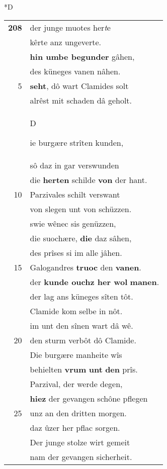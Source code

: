 \documentclass[8pt,a4paper,notitlepage]{article}
\begin{document}
\begin{table}[ht]
\begin{minipage}[t]{0.5\linewidth}
\small
\begin{center}*D
\end{center}
\begin{tabular}{rl}
\textbf{208} & der junge muotes her\textit{t}e\\ 
 & kêrte anz ungeverte.\\ 
 & \textbf{hin umbe begunder} gâhen,\\ 
 & des küneges vanen nâhen.\\ 
5 & \textbf{seht}, dô wart Clamides solt\\ 
 & alrêst mit schaden dâ geholt.\\ 
 & \begin{large}D\end{large}ie burgære strîten kunden,\\ 
 & sô daz in gar verswunden\\ 
 & die \textbf{herten} schilde \textbf{von} der hant.\\ 
10 & Parzivales schilt verswant\\ 
 & von slegen unt von schüzzen.\\ 
 & swie wênec sis genüzzen,\\ 
 & die suochære, \textbf{die} daz sâhen,\\ 
 & des prîses si im alle jâhen.\\ 
15 & Galogandres \textbf{truoc} den \textbf{vanen}.\\ 
 & der \textbf{kunde ouchz her wol} \textbf{manen}.\\ 
 & der lag ans küneges sîten tôt.\\ 
 & Clamide kom selbe in nôt.\\ 
 & im unt den sînen wart dâ wê.\\ 
20 & den sturm verbôt dô Clamide.\\ 
 & Die burgære manheite wîs\\ 
 & behielten \textbf{vrum} \textbf{unt} \textbf{den} prîs.\\ 
 & Parzival, der werde degen,\\ 
 & \textbf{hiez} der gevangen schône pflegen\\ 
25 & unz an den dritten morgen.\\ 
 & daz ûzer her pflac sorgen.\\ 
 & Der junge stolze wirt gemeit\\ 
 & nam der gevangen sicherheit.\\ 

\end{tabular}
\end{minipage}
\end{table}
\end{document}
